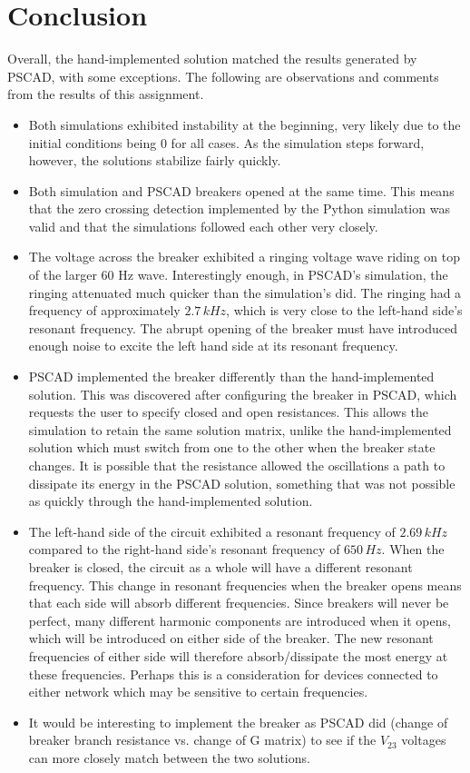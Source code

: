 \documentclass[10pt, oneside, letterpaper]{article}
\begin{document}
\section{Conclusion}
Overall, the hand-implemented solution matched the results generated by PSCAD, with some exceptions. The following are observations and comments from the results of this assignment.
\begin{itemize}
    \item Both simulations exhibited instability at the beginning, very likely due to the initial conditions being 0 for all cases. As the simulation steps forward, however, the solutions stabilize fairly quickly.
    \item Both simulation and PSCAD breakers opened at the same time. This means that the zero crossing detection implemented by the Python simulation was valid and that the simulations followed each other very closely.
    \item The voltage across the breaker exhibited a ringing voltage wave riding on top of the larger 60 Hz wave. Interestingly enough, in PSCAD's simulation, the ringing attenuated much quicker than the simulation's did. The ringing had a frequency of approximately $2.7\,kHz$, which is very close to the left-hand side's resonant frequency. The abrupt opening of the breaker must have introduced enough noise to excite the left hand side at its resonant frequency.
    \item PSCAD implemented the breaker differently than the hand-implemented solution. This was discovered after configuring the breaker in PSCAD, which requests the user to specify closed and open resistances. This allows the simulation to retain the same solution matrix, unlike the hand-implemented solution which must switch from one to the other when the breaker state changes. It is possible that the resistance allowed the oscillations a path to dissipate its energy in the PSCAD solution, something that was not possible as quickly through the hand-implemented solution.\
    \item The left-hand side of the circuit exhibited a resonant frequency of $2.69\,kHz$ compared to the right-hand side's resonant frequency of $650\,Hz$. When the breaker is closed, the circuit as a whole will have a different resonant frequency. This change in resonant frequencies when the breaker opens means that each side will absorb different frequencies. Since breakers will never be perfect, many different harmonic components are introduced when it opens, which will be introduced on either side of the breaker. The new resonant frequencies of either side will therefore absorb/dissipate the most energy at these frequencies. Perhaps this is a consideration for devices connected to either network which may be sensitive to certain frequencies.
    \item It would be interesting to implement the breaker as PSCAD did (change of breaker branch resistance vs. change of G matrix) to see if the $V_{23}$ voltages can more closely match between the two solutions.
\end{itemize}
\end{document}
